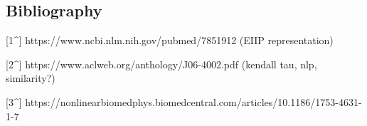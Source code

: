\documentclass[]{article}
\begin{document}
\hypertarget{bibliography}{%
\subsection{Bibliography}\label{bibliography}}

{[}1\^{}{]} https://www.ncbi.nlm.nih.gov/pubmed/7851912 (EIIP
representation)

{[}2\^{}{]} https://www.aclweb.org/anthology/J06-4002.pdf (kendall tau,
nlp, similarity?)

{[}3\^{}{]}
https://nonlinearbiomedphys.biomedcentral.com/articles/10.1186/1753-4631-1-7
\end{document}
